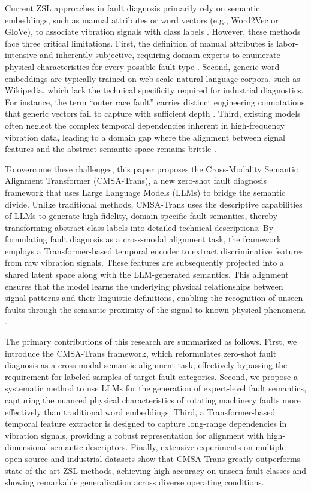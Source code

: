 Current ZSL approaches in fault diagnosis primarily rely on semantic embeddings, such as manual attributes or word vectors (e.g., Word2Vec or GloVe), to associate vibration signals with class labels \cite{lampert2014attribute}. However, these methods face three critical limitations. First, the definition of manual attributes is labor-intensive and inherently subjective, requiring domain experts to enumerate physical characteristics for every possible fault type \cite{fu2018zero}. Second, generic word embeddings are typically trained on web-scale natural language corpora, such as Wikipedia, which lack the technical specificity required for industrial diagnostics. For instance, the term ``outer race fault'' carries distinct engineering connotations that generic vectors fail to capture with sufficient depth \cite{mikolov2013efficient}. Third, existing models often neglect the complex temporal dependencies inherent in high-frequency vibration data, leading to a domain gap where the alignment between signal features and the abstract semantic space remains brittle \cite{xian2018zero, buchert2020zero}.

To overcome these challenges, this paper proposes the Cross-Modality Semantic Alignment Transformer (CMSA-Trans), a new zero-shot fault diagnosis framework that uses Large Language Models (LLMs) to bridge the semantic divide. Unlike traditional methods, CMSA-Trans uses the descriptive capabilities of LLMs to generate high-fidelity, domain-specific fault semantics, thereby transforming abstract class labels into detailed technical descriptions. By formulating fault diagnosis as a cross-modal alignment task, the framework employs a Transformer-based temporal encoder to extract discriminative features from raw vibration signals. These features are subsequently projected into a shared latent space along with the LLM-generated semantics. This alignment ensures that the model learns the underlying physical relationships between signal patterns and their linguistic definitions, enabling the recognition of unseen faults through the semantic proximity of the signal to known physical phenomena \cite{vaswani2017attention, radford2021learning}.

The primary contributions of this research are summarized as follows. First, we introduce the CMSA-Trans framework, which reformulates zero-shot fault diagnosis as a cross-modal semantic alignment task, effectively bypassing the requirement for labeled samples of target fault categories. Second, we propose a systematic method to use LLMs for the generation of expert-level fault semantics, capturing the nuanced physical characteristics of rotating machinery faults more effectively than traditional word embeddings. Third, a Transformer-based temporal feature extractor is designed to capture long-range dependencies in vibration signals, providing a robust representation for alignment with high-dimensional semantic descriptors. Finally, extensive experiments on multiple open-source and industrial datasets show that CMSA-Trans greatly outperforms state-of-the-art ZSL methods, achieving high accuracy on unseen fault classes and showing remarkable generalization across diverse operating conditions.

